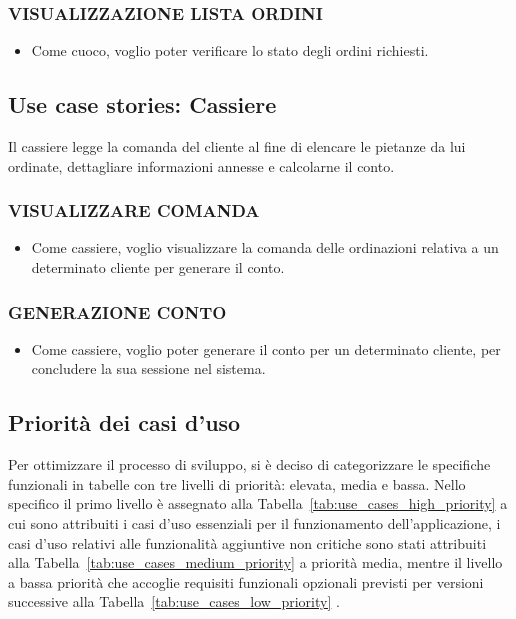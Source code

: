 \subsubsection{VISUALIZZAZIONE LISTA ORDINI} 
\begin{itemize}
	\item Come cuoco, voglio poter verificare lo stato degli ordini richiesti.
\end{itemize}

\subsection{Use case stories: Cassiere}
Il cassiere legge la comanda del cliente al fine di elencare le pietanze da lui ordinate, dettagliare informazioni annesse e calcolarne il conto.
\subsubsection{VISUALIZZARE COMANDA} 
\begin{itemize}
	\item Come cassiere, voglio visualizzare la comanda delle ordinazioni relativa a un determinato cliente per generare il conto.
\end{itemize}

\subsubsection{GENERAZIONE CONTO} 
\begin{itemize}
	\item Come cassiere, voglio poter generare il conto per un determinato cliente, per concludere la sua sessione nel sistema.
	
\end{itemize}


\subsection{Priorità dei casi d’uso}

Per ottimizzare il processo di sviluppo, si è deciso di categorizzare le specifiche funzionali in tabelle con tre livelli di priorità: elevata, media e bassa. Nello specifico il primo livello è assegnato alla Tabella~\ref{tab:use_cases_high_priority} a cui sono attribuiti i casi d'uso essenziali per il funzionamento dell'applicazione, i casi d'uso relativi alle funzionalità aggiuntive non critiche sono stati attribuiti alla Tabella~\ref{tab:use_cases_medium_priority} a priorità media, mentre il livello a bassa priorità che accoglie requisiti funzionali opzionali previsti per versioni successive alla Tabella~\ref{tab:use_cases_low_priority} .

